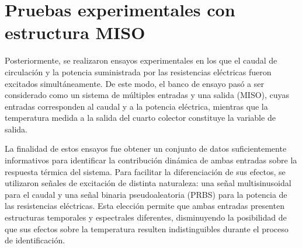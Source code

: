 \documentclass[11pt]{report}
\begin{document}
\section{Pruebas experimentales con estructura MISO }


Posteriormente, se realizaron ensayos experimentales en los que el caudal de circulación y la potencia suministrada por las resistencias eléctricas fueron excitados simultáneamente. De este modo, el banco de ensayo pasó a ser considerado como un sistema de múltiples entradas y una salida (MISO), cuyas entradas corresponden al caudal y a la potencia eléctrica, mientras que la temperatura medida a la salida del cuarto colector constituye la variable de salida.

La finalidad de estos ensayos fue obtener un conjunto de datos suficientemente informativos para identificar la contribución dinámica de ambas entradas sobre la respuesta térmica del sistema. Para facilitar la diferenciación de sus efectos, se utilizaron señales de excitación de distinta naturaleza: una señal multisinusoidal para el caudal y una señal binaria pseudoaleatoria (PRBS) para la potencia de las resistencias eléctricas. Esta elección permite que ambas entradas presenten estructuras temporales y espectrales diferentes, disminuyendo la posibilidad de que sus efectos sobre la temperatura resulten indistinguibles durante el proceso de identificación.




\end{document}
